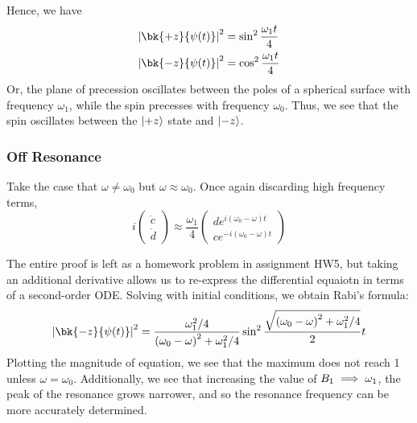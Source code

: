 Hence, we have
\begin{subequations}
	\begin{align}
		\abs{\bk{+z}{\p(t)}}^2 &= \sin^2\frac{\omega_1 t}{4}\\
		\abs{\bk{-z}{\p(t)}}^2 &= \cos^2\frac{\omega_1 t}{4}\\
	\end{align}
\end{subequations}
Or, the plane of precession oscillates between the poles of a spherical surface with frequency \(\omega_1\), while the spin precesses with frequency \(\omega_0\). Thus, we see that the spin oscillates between the \(\lvert+z\rangle\) state and \(\lvert-z\rangle\).

\subsubsection{Off Resonance}
Take the case that \(\omega\neq\omega_0\) but \(\omega\approx\omega_0\). Once again discarding high frequency terms,
\begin{equation}
	i \begin{pmatrix}
	\dot c \\ \dot d
\end{pmatrix} \approx \frac{\omega_1}{4} \begin{pmatrix}
de^{i(\omega_0-\omega)t}\\
ce^{-i(\omega_0-\omega)t}
\end{pmatrix}
\end{equation}

The entire proof is left as a homework problem in assignment HW5, but taking an additional derivative allows us to re-express the differential equaiotn in terms of a second-order ODE\@. Solving with initial conditions, we obtain Rabi's formula:
\begin{equation}
		\abs{\bk{-z}{\p(t)}}^2=\frac{\omega_1^2/4}{\left(\omega_0-\omega\right)^2+\omega_1^2/4}\sin^2\frac{\sqrt{\left(\omega_0-\omega\right)^2+\omega_1^2/4}}{2}t
\end{equation}
Plotting the magnitude of equation, we see that the maximum does not reach 1 unless \(\omega = \omega_0\). Additionally, we see that increasing the value of \(B_1\implies \omega_1\), the peak of the resonance grows narrower, and so the resonance frequency can be more accurately determined.

